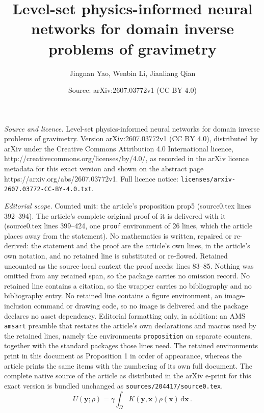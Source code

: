 \documentclass[10pt,a4paper]{amsart}
\title{Level-set physics-informed neural networks for domain inverse problems of gravimetry}
\author{Jingnan Yao, Wenbin Li, Jianliang Qian}
\date{Source: arXiv:2607.03772v1 (CC BY 4.0)}
\begin{document}
\maketitle

\noindent\emph{Source and licence.} Level-set physics-informed neural networks for domain inverse problems of gravimetry. Version arXiv:2607.03772v1 (CC BY 4.0), distributed by arXiv under the Creative Commons Attribution 4.0 International licence, http://creativecommons.org/licenses/by/4.0/, as recorded in the arXiv licence metadata for this exact version and shown on the abstract page https://arxiv.org/abs/2607.03772v1. Full licence notice: \texttt{licenses/arxiv-2607.03772-CC-BY-4.0.txt}.\par\smallskip

\noindent\textit{Editorial scope.} Counted unit: the article's proposition prop5 (source0.tex lines 392--394). The article's complete original proof of it is delivered with it (source0.tex lines 399--424, one \texttt{proof} environment of 26 lines, which the article places away from the statement). No mathematics is written, repaired or re-derived: the statement and the proof are the article's own lines, in the article's own notation, and no retained line is substituted or re-flowed.  Retained uncounted as the source-local context the proof needs: lines 83--85.  Nothing was omitted from any retained span, so the package carries no omission record.  No retained line contains a citation, so the wrapper carries no bibliography and no bibliography entry.  No retained line contains a figure environment, an image-inclusion command or drawing code, so no image is delivered and the package declares no asset dependency.  Editorial formatting only, in addition: an AMS \texttt{amsart} preamble that restates the article's own declarations and macros used by the retained lines, namely the environments \texttt{proposition} on separate counters, together with the standard packages those lines need.  The retained environments print in this document as Proposition 1 in order of appearance, whereas the article prints the same items with the numbering of its own full document.  The complete native source of the article as distributed in the arXiv e-print for this exact version is bundled unchanged as \texttt{sources/204417/source0.tex}.
\begin{equation}\label{eqn1}
U(\mathbf{y};\rho)=\gamma\int_\Omega K(\mathbf{y},\mathbf{x})\rho(\mathbf{x})\,\mathrm{d}\mathbf{x}\,.
\end{equation}
\end{document}
